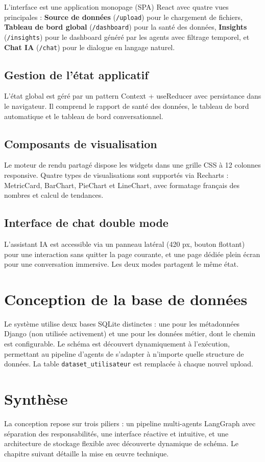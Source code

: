 L'interface est une application monopage (SPA) React avec quatre vues principales : \textbf{Source de données} (\texttt{/upload}) pour le chargement de fichiers, \textbf{Tableau de bord global} (\texttt{/dashboard}) pour la santé des données, \textbf{Insights} (\texttt{/insights}) pour le dashboard généré par les agents avec filtrage temporel, et \textbf{Chat IA} (\texttt{/chat}) pour le dialogue en langage naturel.

\subsection{Gestion de l'état applicatif}

L'état global est géré par un pattern Context + useReducer avec persistance dans le navigateur. Il comprend le rapport de santé des données, le tableau de bord automatique et le tableau de bord conversationnel.

\subsection{Composants de visualisation}

Le moteur de rendu partagé dispose les widgets dans une grille CSS à 12 colonnes responsive. Quatre types de visualisations sont supportés via Recharts : MetricCard, BarChart, PieChart et LineChart, avec formatage français des nombres et calcul de tendances.

\subsection{Interface de chat double mode}

L'assistant IA est accessible via un panneau latéral (420 px, bouton flottant) pour une interaction sans quitter la page courante, et une page dédiée plein écran pour une conversation immersive. Les deux modes partagent le même état.

\section{Conception de la base de données}

Le système utilise deux bases SQLite distinctes : une pour les métadonnées Django (non utilisée activement) et une pour les données métier, dont le chemin est configurable. Le schéma est découvert dynamiquement à l'exécution, permettant au pipeline d'agents de s'adapter à n'importe quelle structure de données. La table \texttt{dataset\_utilisateur} est remplacée à chaque nouvel upload.

\section{Synthèse}

La conception repose sur trois piliers : un pipeline multi-agents LangGraph avec séparation des responsabilités, une interface réactive et intuitive, et une architecture de stockage flexible avec découverte dynamique de schéma. Le chapitre suivant détaille la mise en œuvre technique.
